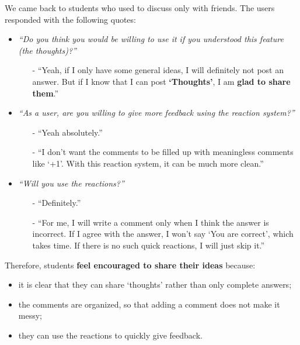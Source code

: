 \documentclass[a4paper]{article}
\begin{document}
    We came back to students who used to discuss only with friends.
    The users responded with the following quotes:
    \begin{itemize}
        \item \textit{``Do you think you would be willing to use it if you understood this feature (the thoughts)?''}
        \begin{itemize}
            \item[-] ``Yeah, if I only have some general ideas, I will definitely not post an answer.
            But if I know that I can post \textbf{`Thoughts'}, I am \textbf{glad to share them}.''
        \end{itemize}

        \item
        \textit{``As a user, are you willing to give more feedback using the reaction system?''}
        \begin{itemize}
            \item[-] ``Yeah absolutely.''
            \item[-] ``I don’t want the comments to be filled up with meaningless comments like `+1'.
            With this reaction system, it can be much more clean.''
        \end{itemize}

        \item \textit{``Will you use the reactions?''}
        \begin{itemize}
            \item[-] ``Definitely.''
            \item[-] ``For me, I will write a comment only when I think the answer is incorrect.
            If I agree with the answer, I won't say `You are correct', which takes time.
            If there is no such quick reactions, I will just skip it.''
        \end{itemize}
    \end{itemize}

    Therefore, students \textbf{feel encouraged to share their ideas} because:
    \begin{itemize}
        \item it is clear that they can share `thoughts' rather than only complete answers;
        \item the comments are organized, so that adding a comment does not make it messy;
        \item they can use the reactions to quickly give feedback.
    \end{itemize}
\end{document}
